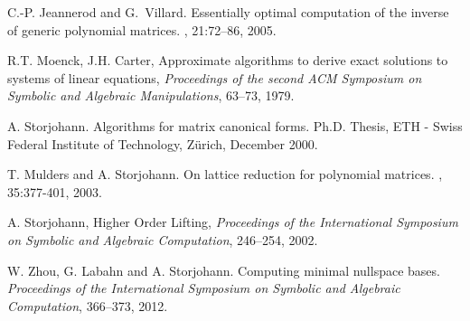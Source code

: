 \documentclass[a4paper,11pt]{article}
\begin{document}
\begin{thebibliography}{22}
C.-P. Jeannerod and G.~Villard.
\newblock Essentially optimal computation of the inverse of generic polynomial matrices.
, 21:72--86, 2005.

R.T. Moenck, J.H. Carter,
\newblock Approximate algorithms to derive exact solutions to systems of linear equations,
\newblock \emph{Proceedings of the second ACM Symposium on Symbolic and Algebraic Manipulations}, 63--73, 1979.

A. Storjohann. 
\newblock Algorithms for matrix canonical forms. 
\newblock Ph.D. Thesis, ETH - Swiss Federal Institute of Technology, Z\"urich, December 2000.

T. Mulders and A. Storjohann.
\newblock On lattice reduction for polynomial matrices.
, 35:377-401, 2003.

A. Storjohann,
\newblock Higher Order Lifting,
\newblock \emph{Proceedings of the International Symposium on Symbolic and
  Algebraic Computation},  246--254, 2002.

W. Zhou, G. Labahn and A. Storjohann.
\newblock Computing minimal nullspace bases.
\newblock \emph{Proceedings of the International Symposium on Symbolic and
  Algebraic Computation},  366--373, 2012.

\end{thebibliography}

\newpage
\appendix
\end{document}
